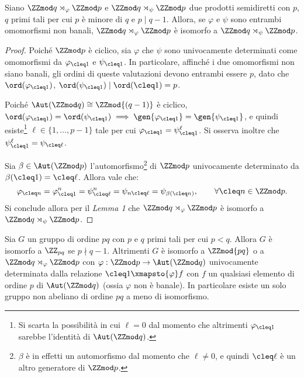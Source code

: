 \documentclass[12pt]{scrartcl}
\begin{document}
	\begin{lemma}
		Siano $\ZZmod q \rtimes_\varphi \ZZmod p$ e
		$\ZZmod q \rtimes_\psi \ZZmod p$ due prodotti
		semidiretti con $p$, $q$ primi tali per cui
		$p$ è minore di $q$ e $p \mid q-1$. Allora,
		se $\varphi$ e $\psi$ sono entrambi omomorfismi non banali,
		$\ZZmod q \rtimes_\varphi \ZZmod p$ è isomorfo
		a $\ZZmod q \rtimes_\psi \ZZmod p$.
	\end{lemma}
	
	\begin{proof}
		Poiché $\ZZmod p$ è ciclico, sia $\varphi$ che
		$\psi$ sono univocamente determinati come
		omomorfismi da $\varphi_{\cleq 1}$ e
		$\psi_{\cleq 1}$. In particolare, affinché i due
		omomorfismi non siano banali, gli ordini di
		queste valutazioni devono entrambi essere $p$,
		dato che $\ord(\varphi_{\cleq 1})$, $\ord(\psi_{\cleq 1})
		\mid \ord(\cleq 1) = p$. \medskip
		
		
		Poiché $\Aut(\ZZmod q) \cong \ZZmod{(q-1)}$ è ciclico,
		$\ord(\varphi_{\cleq 1}) = \ord(\psi_{\cleq 1}) \implies \gen{\varphi_{\cleq 1}} = \gen{\psi_{\cleq 1}}$, e quindi
		esiste\footnote{
			Si scarta la possibilità in cui $\ell = 0$ dal
			momento che altrimenti $\varphi_{\cleq 1}$ sarebbe
			l'identità di $\Aut(\ZZmod q)$.
		} $\ell \in \{1, \ldots, p-1\}$ tale per cui $\varphi_{\cleq 1} = \psi_{\cleq 1}^\ell$. Si osserva inoltre
		che $\psi_{\cleq 1}^\ell = \psi_{\cleq \ell}$. \medskip
		
		
		Sia $\beta \in \Aut(\ZZmod p)$ l'automorfismo\footnote{
			$\beta$ è in effetti un automorfismo dal momento
			che $\ell \neq 0$, e quindi $\cleq \ell$ è un altro
			generatore di $\ZZmod p$.
		} di $\ZZmod p$ univocamente
		determinato da $\beta(\cleq 1) = \cleq \ell$. Allora
		vale che:
		\[ \varphi_{\cleq n} = \varphi_{\cleq 1}^n =
			\psi_{\cleq \ell}^n = \psi_{n \cleq \ell} = \psi_{\beta(\cleq n)}, \qquad \forall \cleq n \in \ZZmod p. \]
		Si conclude allora per il \textit{Lemma 1} che
		$\ZZmod q \rtimes_\varphi \ZZmod p$ è isomorfo
		a $\ZZmod q \rtimes_\psi \ZZmod p$.
	\end{proof}
	
	\begin{proposition}
		Sia $G$ un gruppo di ordine $pq$ con $p$ e $q$ primi tali per cui $p < q$. Allora $G$ è
		isomorfo a $\ZZ_{pq}$ se $p \nmid q-1$. Altrimenti $G$ è isomorfo a $\ZZmod{pq}$ o
		a $\ZZmod q \rtimes_\varphi \ZZmod p$ con $\varphi : \ZZmod p \to \Aut(\ZZmod q)$
		univocamente determinata dalla relazione
		$\cleq 1 \xmapsto{\varphi} f$ con $f$ un qualsiasi elemento
		di ordine $p$ di $\Aut(\ZZmod q)$ (ossia $\varphi$ non è banale). In particolare esiste un solo gruppo non abeliano
		di ordine $pq$ a meno di isomorfismo.
	\end{proposition}
	
\end{document}
